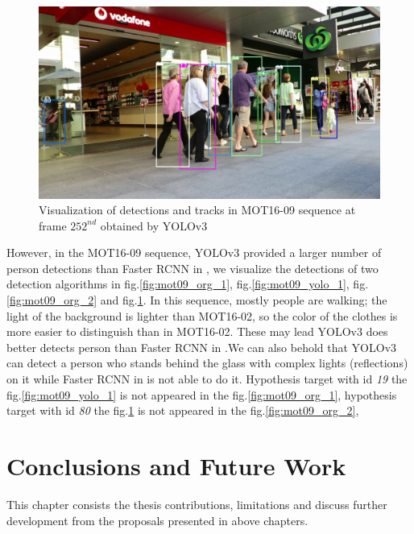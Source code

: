 \begin{figure}[h!]
    \centering
    \includegraphics[width=\textwidth]{Chapters/Fig/mot09_yolo_2.jpg}
    \caption{Visualization of detections and tracks in MOT16-09 sequence at frame $\text{252}^{nd}$ obtained by YOLOv3}
    \label{fig:mot09_yolo_2}
\end{figure}\par
However, in the MOT16-09 sequence, YOLOv3\cite{yolov3} provided a larger number
of person detections than Faster \acrshort{RCNN} in \cite{Wojke2017simple}, we visualize the detections of two detection algorithms in fig.\ref{fig:mot09_org_1},
fig.\ref{fig:mot09_yolo_1}, fig.\ref{fig:mot09_org_2} and fig.\ref{fig:mot09_yolo_2}. In this sequence, mostly people are walking; 
the light of the background is lighter than MOT16-02, so the color of the clothes is more easier to distinguish than in MOT16-02. These may 
lead YOLOv3 \cite{yolov3} does better detects person than Faster \acrshort{RCNN} in \cite{Wojke2017simple}.We can also behold that YOLOv3\cite{yolov3}
can detect a person who stands behind the glass with complex lights (reflections) on it while Faster \acrshort{RCNN} in \cite{Wojke2017simple}
is not able to do it. Hypothesis target with id \textit{19} the fig.\ref{fig:mot09_yolo_1} is not appeared in the fig.\ref{fig:mot09_org_1},
hypothesis target with id \textit{80} the fig.\ref{fig:mot09_yolo_2} is not appeared in the fig.\ref{fig:mot09_org_2},


\chapter{Conclusions and Future Work}
\hspace{0.45cm} This chapter consists the thesis contributions, limitations and discuss further development from the proposals presented in above chapters.
